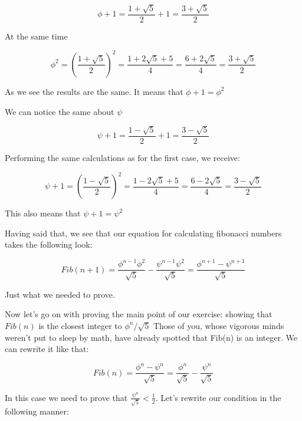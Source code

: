 \documentclass{article}
\begin{document}
\begin{equation}
	\phi+1 = \frac {1 + \sqrt5} {2} + 1 = \frac {3 + \sqrt5} {2}
\end{equation}

At the same time

\begin{equation}
	\phi^2 = \left(\frac {1 + \sqrt5} {2}\right)^2 = \frac {1 + 2\sqrt5 + 5} {4} = \frac {6 + 2\sqrt5} {4} = \frac {3 + \sqrt5} {2}
\end{equation}

As we see the results are the same. It means that $\phi+1 = \phi^2$

We can notice the same about $\psi$

\begin{equation}
	\psi+1 = \frac{1 - \sqrt5} {2} + 1 = \frac {3 - \sqrt5} {2}
\end{equation}

Performing the same calculations as for the first case, we receive:

\begin{equation}
	\psi+1 = \left(\frac {1 - \sqrt5} {2}\right)^2 = \frac {1 - 2\sqrt5 + 5} {4} = \frac {6 - 2\sqrt5} {4} = \frac {3 - \sqrt5} {2}
\end{equation}

This also means that $\psi+1 = \psi^2$

Having said that, we see that our equation for calculating fibonacci numbers takes the following look:

\begin{equation}
	Fib(n+1) = \frac {\phi^{n-1}\phi^2} {\sqrt5} - \frac{\psi^{n-1}\psi^2} {\sqrt5} = \frac {\phi^{n+1} - \psi^{n+1}} {\sqrt5}
\end{equation}

Just what we needed to prove.

Now let's go on with proving the main point of our exercise: showing that $Fib(n)$ is the closest integer to $\phi^n / \sqrt5$ Those of you, whose vigorous minds weren't put to sleep by math, have already spotted that Fib(n) is an integer. We can rewrite it like that:

\begin{equation}
	Fib(n) = \frac {\phi^n - \psi^n} {\sqrt5} = \frac {\phi^n} {\sqrt5} - \frac{\psi^n} {\sqrt5}
\end{equation}

In this case we need to prove that $\frac{\psi^n} {\sqrt5} < \frac {1} {2}$. Let's rewrite our condition in the following manner:
\end{document}
